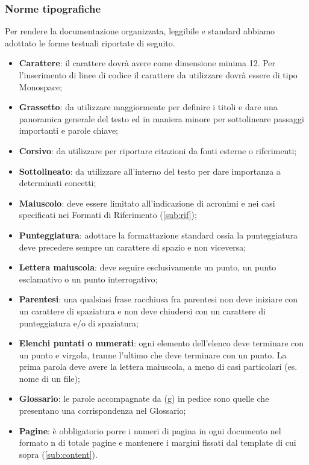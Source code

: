 {{		\subsubsection{Norme tipografiche}{
			\label{sub:typo}
			Per rendere la documentazione organizzata, leggibile e standard abbiamo adottato le forme testuali riportate di seguito.
			\begin{itemize}
				\item \textbf{Carattere}: il carattere dovrà avere come dimensione minima 12. Per l'inserimento di linee di codice il carattere da utilizzare dovrà essere di tipo Monospace;
				\item \textbf{Grassetto}: da utilizzare maggiormente per definire i titoli e dare una panoramica generale del testo ed in maniera minore per sottolineare passaggi importanti e parole chiave;
				\item \textbf{Corsivo}: da utilizzare per riportare citazioni da fonti esterne o riferimenti;
				\item \textbf{Sottolineato}: da utilizzare all'interno del testo per dare importanza a determinati concetti;
				\item \textbf{Maiuscolo}: deve essere limitato all’indicazione di acronimi e nei casi specificati nei Formati di Riferimento (\ref{sub:rif});
				\item \textbf{Punteggiatura}: adottare la formattazione standard ossia la punteggiatura deve precedere sempre un carattere di spazio e non viceversa;
				\item \textbf{Lettera maiuscola}: deve seguire esclusivamente un punto, un punto esclamativo o un punto interrogativo;
				\item \textbf{Parentesi}: una qualsiasi frase racchiusa fra parentesi non deve iniziare con un carattere di spaziatura e non deve chiudersi con un carattere di punteggiatura e/o di spaziatura;
				\item \textbf{Elenchi puntati o numerati}: ogni elemento dell’elenco deve terminare con un punto e virgola, tranne l’ultimo che deve terminare con un punto. La prima parola deve avere la lettera maiuscola, a meno di casi particolari (es. nome di un file);
				\item \textbf{Glossario}: le parole accompagnate da (g) in pedice sono quelle che presentano una corrispondenza nel Glossario;
				\item \textbf{Pagine}: è obbligatorio porre i numeri di pagina in ogni documento nel formato {n} di {totale pagine} e mantenere i margini fissati dal template di cui sopra (\ref{sub:content}).
			\end{itemize}
		}
}}
